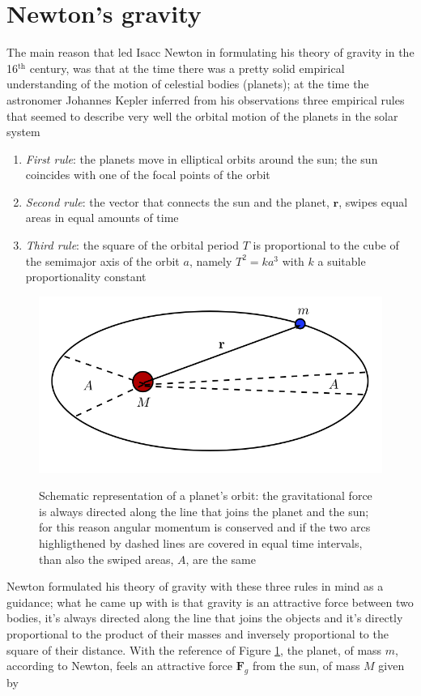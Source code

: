 \section{Newton's gravity}
The main reason that led Isacc Newton in formulating his theory of gravity in the 16$^{\mathrm{th}}$ century, was that at the time there was a pretty solid empirical understanding of the motion of celestial bodies (planets); at the time the astronomer Johannes Kepler inferred from his observations three empirical rules that seemed to describe very well the orbital motion of the planets in the solar system
\begin{enumerate}
\item \textit{First rule}: the planets move in elliptical orbits around the sun; the sun coincides with one of the focal points of the orbit
\item \textit{Second rule}: the vector that connects the sun and the planet, $\mathbf{r}$, swipes equal areas in equal amounts of time
\item \textit{Third rule}: the square of the orbital period $T$ is proportional to the cube of the semimajor axis of the orbit $a$, namely $T^2=ka^3$ with $k$ a suitable proportionality constant
\end{enumerate}
\begin{figure}
\begin{center}
\includegraphics[scale=0.7]{Draw/kepler.png}
\label{}
\end{center}
\caption{Schematic representation of a planet's orbit: the gravitational force is always directed along the line that joins the planet and the sun; for this reason angular momentum is conserved and if the two arcs highligthened by dashed lines are covered in equal time intervals, than also the swiped areas, $A$, are the same}
\label{kepler}
\end{figure}
Newton formulated his theory of gravity with these three rules in mind as a guidance; what he came up with is that gravity is an attractive force between two bodies, it's always directed along the line that joins the objects and it's directly proportional to the product of their masses and inversely proportional to the square of their distance. With the reference of Figure \ref{kepler}, the planet, of mass $m$, according to Newton, feels an attractive force $\mathbf{F}_g$ from the sun, of mass $M$ given by
